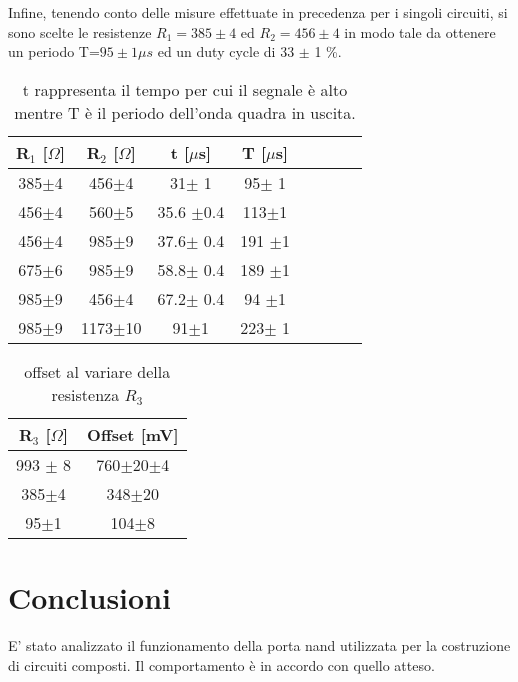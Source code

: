  Infine, tenendo conto delle misure effettuate in precedenza per i singoli circuiti, si sono scelte le resistenze $R_{1}=385 \pm 4$ ed $R_{2}=456 \pm 4$ in modo tale da ottenere un periodo T=$95 \pm 1 \mu s$ ed un duty cycle di 33 $\pm$ 1 \%.
 
\begin{table}[h]
	\centering
	\begin{tabular}{cccccccc }
		{R$_1$ [$\Omega$]} & {R$_2$ [$\Omega$]} & {t [$\mu $s]} & {T [$\mu $s]}\\
		\midrule
           385$\pm$4 & 456$\pm$4 & 31$\pm$ 1 & 95$\pm$ 1\\
           456$\pm$4 & 560$\pm$5 & 35.6 $\pm$0.4 & 113$\pm$1\\
           456$\pm$4 & 985$\pm$9 & 37.6$\pm$ 0.4 & 191 $\pm$1\\
           675$\pm$6 & 985$\pm$9 & 58.8$\pm$ 0.4 & 189 $\pm$1 \\
           985$\pm$9 & 456$\pm$4 & 67.2$\pm$ 0.4 & 94 $\pm$1\\
           985$\pm$9 & 1173$\pm$10 & 91$\pm$1 & 223$\pm$ 1\\
 	\end{tabular}
	\caption{t rappresenta il tempo per cui il segnale è alto mentre T è il periodo dell'onda quadra in uscita. }
	\label{t:onde_quadre}
\end{table} 

\begin{table}[h]
	\centering
	\begin{tabular}{cc}
		{R$_3$ [$\Omega$]} & {Offset [mV]}\\
		\midrule
           993 $\pm$ 8 & 760$\pm$20$\pm$4 \\
           385$\pm$4 & 348$\pm$20 \\
           95$\pm$1 & 104$\pm$8 \\
 	\end{tabular}
	\caption{offset al variare della resistenza $R_3$}
	\label{t:offset}
\end{table} 
 \section{Conclusioni}
 E' stato analizzato il funzionamento della porta nand utilizzata per la costruzione di circuiti composti. Il comportamento è in accordo con quello atteso.
